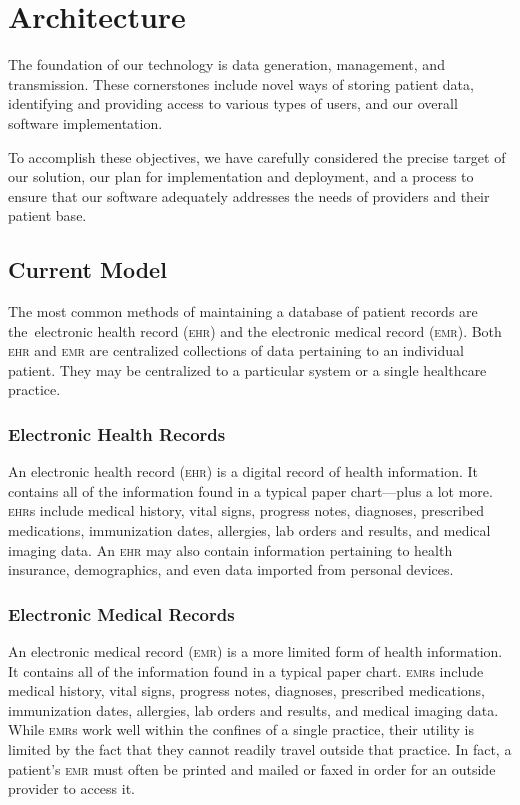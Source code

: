 
\section{Architecture}\label{architecure}
The foundation of our technology is data generation, management, and transmission. These cornerstones include novel ways of storing patient data, identifying and providing access to various types of users, and our overall software implementation.%

To accomplish these objectives, we have carefully considered the precise target of our solution, our plan for implementation and deployment, and a process to ensure that our software adequately addresses the needs of providers and their patient base.%

\subsection{Current Model}
The most common methods of maintaining a database of patient records are the electronic health record (\textsc{ehr}) and the electronic medical record (\textsc{emr}). Both \textsc{ehr} and \textsc{emr} are centralized collections of data pertaining to an individual patient. They may be centralized to a particular system or a single healthcare practice.%

  \subsubsection{Electronic Health Records}
  An electronic health record (\textsc{ehr}) is a digital record of health information. It contains all of the information found in a typical paper chart---plus a lot more. \textsc{ehr}s include medical history, vital signs, progress notes, diagnoses, prescribed medications, immunization dates, allergies, lab orders and results, and medical imaging data. An \textsc{ehr} may also contain information pertaining to health insurance, demographics, and even data imported from personal devices.\cite{EMRvsEHR}%

  \subsubsection{Electronic Medical Records}
  An electronic medical record (\textsc{emr}) is a more limited form of health information. It contains all of the information found in a typical paper chart. \textsc{emr}s include medical history, vital signs, progress notes, diagnoses, prescribed medications, immunization dates, allergies, lab orders and results, and medical imaging data. While \textsc{emr}s work well within the confines of a single practice, their utility is limited by the fact that they cannot readily travel outside that practice. In fact, a patient's \textsc{emr} must often be printed and mailed or faxed in order for an outside provider to access it.\cite{EMRvsEHR}%

